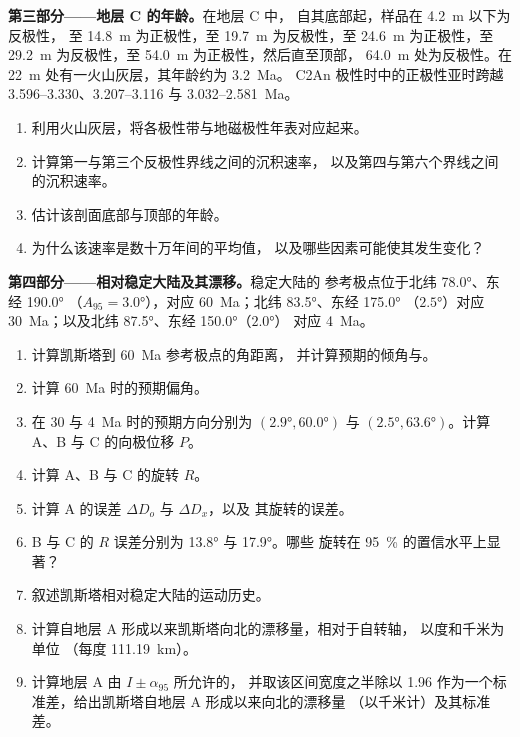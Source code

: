 \begin{problem}
\medskip\noindent\textbf{第三部分——地层 C 的年龄。}在地层 C 中，
自其底部起，样品在 \qty{4.2}{m} 以下为反极性，
至 \qty{14.8}{m} 为正极性，至 \qty{19.7}{m} 为反极性，至 \qty{24.6}{m} 为正极性，至
\qty{29.2}{m} 为反极性，至 \qty{54.0}{m} 为正极性，然后直至顶部，
\qty{64.0}{m} 处为反极性。在 \qty{22}{m} 处有一火山灰层，其年龄约为 \qty{3.2}{Ma}。
C2An 极性时中的正极性亚时跨越 3.596--3.330、3.207--3.116 与
3.032--\qty{2.581}{Ma}。
\begin{enumerate}[resume]
  \item 利用火山灰层，将各极性带与地磁极性年表对应起来。
  \item 计算第一与第三个反极性界线之间的沉积速率，
        以及第四与第六个界线之间的沉积速率。
  \item 估计该剖面底部与顶部的年龄。
  \item 为什么该速率是数十万年间的平均值，
        以及哪些因素可能使其发生变化？
\end{enumerate}

\medskip\noindent\textbf{第四部分——相对稳定大陆及其漂移。}稳定大陆的
参考极点位于北纬 \ang{78.0}、东经 \ang{190.0}
（$A_{95} = \ang{3.0}$），对应 \qty{60}{Ma}；北纬 \ang{83.5}、东经 \ang{175.0}
（$\ang{2.5}$）对应 \qty{30}{Ma}；以及北纬 \ang{87.5}、东经 \ang{150.0}（$\ang{2.0}$）
对应 \qty{4}{Ma}。
\begin{enumerate}[resume]
  \item 计算凯斯塔到 \qty{60}{Ma} 参考极点的角距离，
        并计算预期的倾角与。
  \item 计算 \qty{60}{Ma} 时的预期偏角。
  \item 在 30 与 \qty{4}{Ma} 时的预期方向分别为 $(\ang{2.9},
        \ang{60.0})$ 与 $(\ang{2.5}, \ang{63.6})$。计算
        A、B 与 C 的向极位移 $P$。
  \item 计算 A、B 与 C 的旋转 $R$。
  \item 计算 A 的误差 $\Delta D_o$ 与 $\Delta D_x$，以及
        其旋转的误差。
  \item B 与 C 的 $R$ 误差分别为 \ang{13.8} 与 \ang{17.9}。哪些
        旋转在 \qty{95}{\percent} 的置信水平上显著？
  \item 叙述凯斯塔相对稳定大陆的运动历史。
  \item 计算自地层 A 形成以来凯斯塔向北的漂移量，相对于自转轴，
        以度和千米为单位
        （每度 \qty{111.19}{km}）。
  \item 计算地层 A 由 $I \pm \alpha_{95}$ 所允许的，
        并取该区间宽度之半除以
        1.96 作为一个标准差，给出凯斯塔自地层 A 形成以来向北的漂移量
        （以千米计）及其标准差。
\end{enumerate}
\end{problem}
